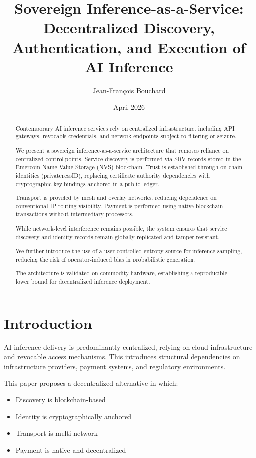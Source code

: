 \documentclass[11pt]{article}
\title{Sovereign Inference-as-a-Service:\\
Decentralized Discovery, Authentication, and Execution of AI Inference}
\author{Jean-François Bouchard}
\date{April 2026}
\begin{document}
\maketitle

\begin{abstract}
Contemporary AI inference services rely on centralized infrastructure, including API gateways, revocable credentials, and network endpoints subject to filtering or seizure.

We present a sovereign inference-as-a-service architecture that removes reliance on centralized control points. Service discovery is performed via SRV records stored in the Emercoin Name-Value Storage (NVS) blockchain. Trust is established through on-chain identities (privatenessID), replacing certificate authority dependencies with cryptographic key bindings anchored in a public ledger.

Transport is provided by mesh and overlay networks, reducing dependence on conventional IP routing visibility. Payment is performed using native blockchain transactions without intermediary processors.

While network-level interference remains possible, the system ensures that service discovery and identity records remain globally replicated and tamper-resistant.

We further introduce the use of a user-controlled entropy source for inference sampling, reducing the risk of operator-induced bias in probabilistic generation.

The architecture is validated on commodity hardware, establishing a reproducible lower bound for decentralized inference deployment.
\end{abstract}

\section{Introduction}

AI inference delivery is predominantly centralized, relying on cloud infrastructure and revocable access mechanisms. This introduces structural dependencies on infrastructure providers, payment systems, and regulatory environments.

This paper proposes a decentralized alternative in which:
\begin{itemize}
    \item Discovery is blockchain-based
    \item Identity is cryptographically anchored
    \item Transport is multi-network
    \item Payment is native and decentralized
\end{itemize}
\end{document}
